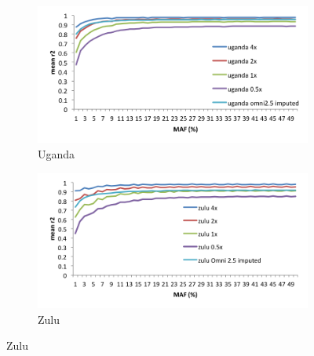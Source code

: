 \begin{figure}
        \centering
        \begin{subfigure}[b]{0.75\textwidth}
                \includegraphics[width=\textwidth]{fig/SN12f5a}
                \caption{Uganda}
        \end{subfigure}%

        \begin{subfigure}[b]{0.75\textwidth}
                \includegraphics[width=\textwidth]{fig/SN12f5b}
                \caption{Zulu}
        \end{subfigure}


\end{figure}
